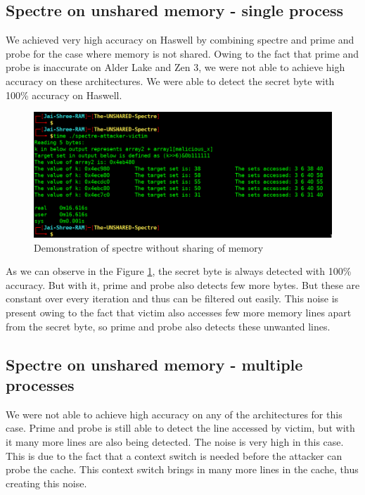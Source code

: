 \subsection{Spectre on unshared memory - single process}
We achieved very high accuracy on Haswell by combining spectre and prime and probe for the case where memory is not shared. Owing to the fact that prime and probe is inaccurate on Alder Lake and Zen 3, we were not able to achieve high accuracy on these architectures. We were able to detect the secret byte with 100\% accuracy on Haswell.
\begin{figure}[h]
    \centering
    \includegraphics[scale=0.4]{images/unshared-spectre.png}
    \caption{Demonstration of spectre without sharing of memory}
    \label{sidechannel}
\end{figure}
\indent As we can observe in the Figure \ref{sidechannel}, the secret byte is always detected with 100\% accuracy. But with it, prime and probe also detects few more bytes. But these are constant over every iteration and thus can be filtered out easily. This noise is present owing to the fact that victim also accesses few more memory lines apart from the secret byte, so prime and probe also detects these unwanted lines.

\subsection{Spectre on unshared memory - multiple processes}
We were not able to achieve high accuracy on any of the architectures for this case. Prime and probe is still able to detect the line accessed by victim, but with it many more lines are also being detected. The noise is very high in this case. This is due to the fact that a context switch is needed before the attacker can probe the cache. This context switch brings in many more lines in the cache, thus creating this noise.
